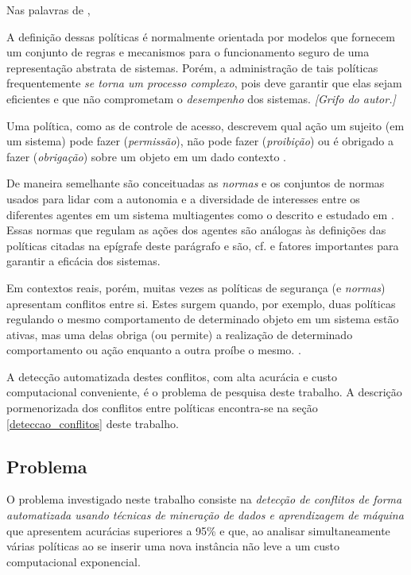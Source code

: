 \documentclass[
	12pt,				%
	openright,			%
	twoside,			%
	a4paper,			%
	english,			%
	french,				%
	spanish,			%
	brazil				%
	]{abntex2}
\begin{document}
Nas palavras de ,
\begin{citacao}
	A definição dessas políticas é normalmente orientada por modelos que fornecem um conjunto de regras e mecanismos para o funcionamento seguro de uma representação abstrata de sistemas. Porém, a administração de tais políticas frequentemente \textit{se torna um processo complexo}, pois deve garantir que elas sejam eficientes e que não comprometam o \textit{desempenho} dos sistemas. \emph{[Grifo do autor.]}
\end{citacao}

Uma política, como as de controle de acesso, descrevem qual ação um sujeito (em um sistema) pode fazer (\textit{permissão}), não pode fazer (\textit{proibição}) ou é obrigado a fazer (\textit{obrigação}) sobre um objeto em um dado contexto \cite{sarkis2017}. 

De maneira semelhante são conceituadas as \textit{normas} e os conjuntos de normas usados para lidar com a autonomia e a diversidade de interesses entre os diferentes agentes em um sistema multiagentes como o descrito e estudado em . Essas normas que regulam as ações dos agentes são análogas às definições das políticas citadas na epígrafe deste parágrafo e são, cf.  e  fatores importantes para garantir a eficácia dos sistemas.

Em contextos reais, porém, muitas vezes as políticas de segurança (e \textit{normas}) apresentam conflitos entre si. Estes surgem quando, por exemplo, duas políticas regulando o mesmo comportamento de determinado objeto em um sistema estão ativas, mas uma delas obriga (ou permite) a realização de determinado comportamento ou ação enquanto a outra proíbe o mesmo. \cite{sarkis2017}\cite{eduardo2017}. 

A detecção automatizada destes conflitos, com alta acurácia e custo computacional conveniente, é o problema de pesquisa deste trabalho. A descrição pormenorizada dos conflitos entre políticas encontra-se na seção \ref{deteccao_conflitos} deste trabalho.
\subsection{Problema}\label{problema}
O problema investigado neste trabalho consiste na \textit{detecção de conflitos de forma automatizada usando técnicas de mineração de dados e aprendizagem de máquina} que apresentem acurácias superiores a 95\% e que, ao analisar simultaneamente várias políticas ao se inserir uma nova instância não leve a um custo computacional exponencial.
\end{document}
